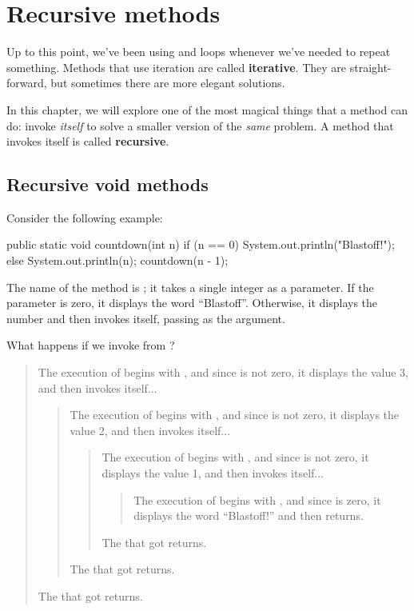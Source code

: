 \chapter{Recursive methods}


Up to this point, we've been using  and  loops whenever we've needed to repeat something.
Methods that use iteration are called {\bf iterative}.
They are straight-forward, but sometimes there are more elegant solutions.

In this chapter, we will explore one of the most magical things that a method can do: invoke {\em itself} to solve a smaller version of the {\em same} problem.
A method that invokes itself is called {\bf recursive}.


\section{Recursive void methods}
\label{recursion}

Consider the following example:

\begin{code}
public static void countdown(int n) {
    if (n == 0) {
        System.out.println("Blastoff!");
    } else {
        System.out.println(n);
        countdown(n - 1);
    }
}
\end{code}

The name of the method is ; it takes a single integer as a parameter.
If the parameter is zero, it displays the word ``Blastoff''.
Otherwise, it displays the number and then invokes itself, passing  as the argument.

What happens if we invoke  from ?

\vspace{-1ex}
\begin{quote}
The execution of  begins with , and since  is not zero, it displays the value 3, and then invokes itself...
\begin{quote}
The execution of  begins with , and since  is not zero, it displays the value 2, and then invokes itself...
\begin{quote}
The execution of  begins with , and since  is not zero, it displays the value 1, and then invokes itself...
\begin{quote}
The execution of  begins with , and since  is zero, it displays the word ``Blastoff!'' and then returns.
\end{quote}
The  that got  returns.
\end{quote}
The  that got  returns.
\end{quote}
The  that got  returns.
\end{quote}
\vspace{-1ex}

